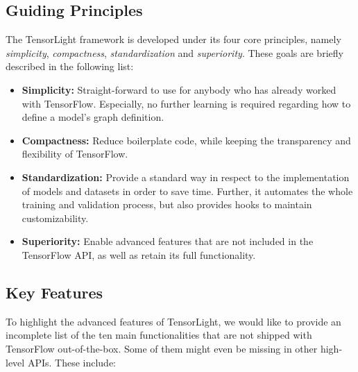 \subsection{Guiding Principles}

The TensorLight framework is developed under its four core principles, namely \textit{simplicity}, \textit{compactness}, \textit{standardization} and \textit{superiority}. These goals are briefly described in the following list:

\begin{itemize}
\item \textbf{Simplicity:} Straight-forward to use for anybody who has already worked with TensorFlow. Especially, no further learning is required regarding how to define a model's graph definition.
\item \textbf{Compactness:} Reduce boilerplate code, while keeping the transparency and flexibility of TensorFlow. 
\item \textbf{Standardization:} Provide a standard way in respect to the implementation of models and datasets in order to save time. Further, it automates the whole training and validation process, but also provides hooks to maintain customizability.
\item \textbf{Superiority:} Enable advanced features that are not included in the TensorFlow API, as well as retain its full functionality.
\end{itemize}


\subsection{Key Features}

To highlight the advanced features of TensorLight, we would like to provide an incomplete list of the ten main functionalities that are not shipped with TensorFlow out-of-the-box. Some of them might even be missing in other high-level APIs. These include:

